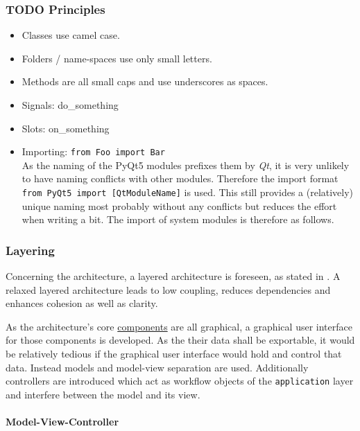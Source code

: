 \documentclass[10pt, openright, notitlepage]{scrreprt}
\begin{document}
\subsubsection{{\bfseries\sffamily TODO} Principles}
\label{sec:org03dd602}

\begin{itemize}
\item Classes use camel case.
\item Folders / name-spaces use only small letters.
\item Methods are all small caps and use underscores as spaces.
\item Signals: do\_something
\item Slots: on\_something
\item Importing: \texttt{from Foo import Bar}\\
As the naming of the PyQt5 modules prefixes them by \emph{Qt}, it is very unlikely
to have naming conflicts with other modules. Therefore the import format
\texttt{from PyQt5 import [QtModuleName]} is used. This still provides a
(relatively) unique naming most probably without any conflicts but reduces the
effort when writing a bit. The import of system modules is therefore as
follows.
\end{itemize}

\subsubsection{Layering}
\label{sec:layering}
Concerning the architecture, a layered architecture is foreseen, as stated in
\cite[p. 38 ff.]{osterwalder_qde_2016}. A relaxed layered architecture leads to
low coupling, reduces dependencies and enhances cohesion as well as clarity.

As the architecture's core \hyperref[sec:components]{components} are all graphical, a graphical user
interface for those components is developed. As the their data shall be
exportable, it would be relatively tedious if the graphical user interface would
hold and control that data. Instead models and model-view separation are used.
Additionally controllers are introduced which act as workflow objects of the
\texttt{application} layer and interfere between the model and its view.

\paragraph{Model-View-Controller}
\label{sec:org96ab0ab}
\end{document}
